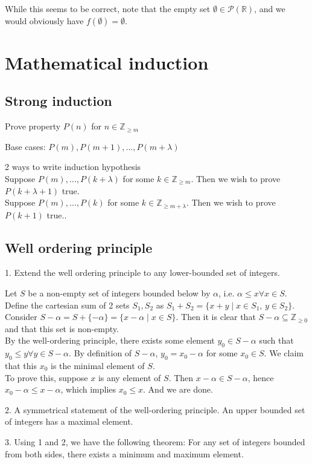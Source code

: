 \documentclass{article}
\begin{document}
While this seems to be correct, note that the empty set $\emptyset \in \mathcal{P}(\mathbb{R})$, and we would obviously have $f(\emptyset)=\emptyset$.

\section{Mathematical induction}
\subsection{Strong induction}
Prove property $P(n)$ for $n\in \mathbb{Z}_{\geq m}$

Base cases: $P(m),P(m+1),\dots,P(m+\lambda)$

2 ways to write induction hypothesis\\
Suppose $P(m),\dots,P(k+\lambda)$ for some $k\in \mathbb{Z}_{\geq m}$. Then we wish to prove $P(k+\lambda+1)$ true.\\
Suppose $P(m),\dots,P(k)$ for some $k\in \mathbb{Z}_{\geq m+\lambda}$. Then we wish to prove $P(k+1)$ true..

\subsection{Well ordering principle}
1. Extend the well ordering principle to any lower-bounded set of integers.

Let $S$ be a non-empty set of integers bounded below by $\alpha$, i.e. $\alpha\leq x\forall x\in S$.
Define the cartesian sum of 2 sets $S_1,S_2$ as $S_1+S_2=\{x+y\mid x\in S_1,\, y\in S_2\}$.\\
Consider $S-\alpha=S+\{-\alpha \}=\{x-\alpha  \mid x\in S\}$. Then it is clear that $S-\alpha \subseteq \mathbb{Z}_{\geq 0}$ and that this set is non-empty.\\
By the well-ordering principle, there exists some element $y_0\in S-\alpha$ such that $y_0\leq y\forall y\in S-\alpha$. By definition of $S-\alpha$, $y_0=x_0-\alpha$ for some $x_0\in S$. We claim that this $x_0$ is the minimal element of $S$.\\
To prove this, suppose $x$ is any element of $S$. Then $x-\alpha \in S-\alpha$, hence $x_0-\alpha \leq x-\alpha$, which implies $x_0\leq x$. And we are done.

2. A symmetrical statement of the well-ordering principle. An upper bounded set of integers has a maximal element.

3. Using 1 and 2, we have the following theorem: For any set of integers bounded from both sides, there exists a minimum and maximum element.
\end{document}
